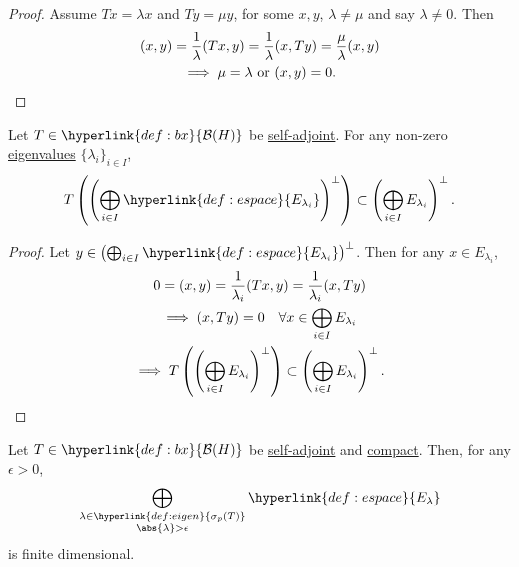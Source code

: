 \documentclass{article}
\begin{document}
\begin{proof}
    Assume $T x = \lambda x$ and $T y = \mu y$, for some $x,y$, $\lambda \neq \mu$ and say $\lambda \neq 0$.
    Then
    \begin{gather*}
        (x,y) = \frac{1}{\lambda} (T x,y) = \frac{1}{\lambda} (x, T y) = \frac{\mu}{\lambda} (x,y) \\
        \implies \mu = \lambda \text{ or } (x, y) = 0. \qedhere
    \end{gather*}
\end{proof}


\begin{lemma}
    Let $T \in \hyperlink{def:bx}{\mathcal{B}(H)}$ be \hyperlink{def:normalMap}{self-adjoint}.
    For any non-zero \hyperlink{def:eigen}{eigenvalues} $\{\lambda_i\}_{i \in I}$,
    \begin{equation*}
        T\left(\left(\bigoplus_{i \in I} \hyperlink{def:espace}{E_{\lambda_i}}\right)^\perp\right) \subset \left(\bigoplus_{i \in I} E_{\lambda_i}\right)^\perp.
    \end{equation*}
\end{lemma}

\begin{proof}
    Let $y \in \left(\bigoplus_{i \in I} \hyperlink{def:espace}{E_{\lambda_i}}\right)^\perp$. Then for any $x \in E_{\lambda_i}$,
    \begin{gather*}
        0 = (x,y) = \frac{1}{\lambda_i} (T x, y) = \frac{1}{\lambda_i} (x, T y) \\
        \implies (x, T y) = 0 \quad \forall x \in \bigoplus_{i \in I} E_{\lambda_i} \\
        \implies T\left(\left(\bigoplus_{i \in I} E_{\lambda_i}\right)^\perp\right) \subset \left(\bigoplus_{i \in I} E_{\lambda_i}\right)^\perp. \qedhere
    \end{gather*}
\end{proof}

\begin{lemma}
    Let $T \in \hyperlink{def:bx}{\mathcal{B}(H)}$ be \hyperlink{def:normalMap}{self-adjoint} and \hyperlink{def:compact}{compact}.
    Then, for any $\epsilon > 0$,
    \begin{equation*}
        \bigoplus_{\substack{\lambda \in \hyperlink{def:eigen}{\sigma_p(T)} \\ \abs{\lambda} > \epsilon}} \hyperlink{def:espace}{E_\lambda}
    \end{equation*}
    is finite dimensional.
\end{lemma}
\end{document}

